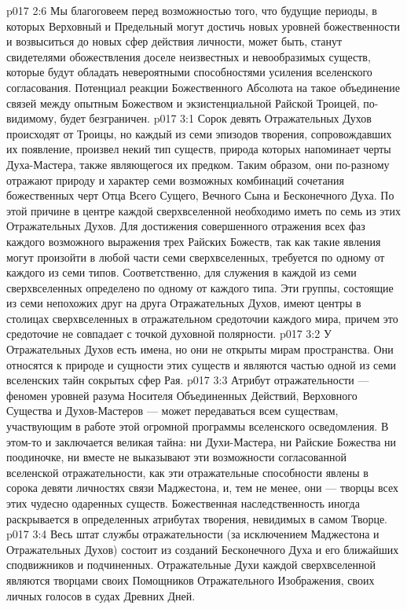 \vs p017 2:6 Мы благоговеем перед возможностью того, что будущие периоды, в которых Верховный и Предельный могут достичь новых уровней божественности и возвыситься до новых сфер действия личности, может быть, станут свидетелями обожествления доселе неизвестных и невообразимых существ, которые будут обладать невероятными способностями усиления вселенского согласования. Потенциал реакции Божественного Абсолюта на такое объединение связей между опытным Божеством и экзистенциальной Райской Троицей, по\hyp{}видимому, будет безграничен.
\vs p017 3:1 Сорок девять Отражательных Духов происходят от Троицы, но каждый из семи эпизодов творения, сопровождавших их появление, произвел некий тип существ, природа которых напоминает черты Духа\hyp{}Мастера, также являющегося их предком. Таким образом, они по\hyp{}разному отражают природу и характер семи возможных комбинаций сочетания божественных черт Отца Всего Сущего, Вечного Сына и Бесконечного Духа. По этой причине в центре каждой сверхвселенной необходимо иметь по семь из этих Отражательных Духов. Для достижения совершенного отражения всех фаз каждого возможного выражения трех Райских Божеств, так как такие явления могут произойти в любой части семи сверхвселенных, требуется по одному от каждого из семи типов. Соответственно, для служения в каждой из семи сверхвселенных определено по одному от каждого типа. Эти группы, состоящие из семи непохожих друг на друга Отражательных Духов, имеют центры в столицах сверхвселенных в отражательном средоточии каждого мира, причем это средоточие не совпадает с точкой духовной полярности.
\vs p017 3:2 У Отражательных Духов есть имена, но они не открыты мирам пространства. Они относятся к природе и сущности этих существ и являются частью одной из семи вселенских тайн сокрытых сфер Рая.
\vs p017 3:3 Атрибут отражательности --- феномен уровней разума Носителя Объединенных Действий, Верховного Существа и Духов\hyp{}Мастеров --- может передаваться всем существам, участвующим в работе этой огромной программы вселенского осведомления. В этом\hyp{}то и заключается великая тайна: ни Духи\hyp{}Мастера, ни Райские Божества ни поодиночке, ни вместе не выказывают эти возможности согласованной вселенской отражательности, как эти отражательные способности явлены в сорока девяти личностях связи Маджестона, и, тем не менее, они --- творцы всех этих чудесно одаренных существ. Божественная наследственность иногда раскрывается в определенных атрибутах творения, невидимых в самом Творце.
\vs p017 3:4 Весь штат службы отражательности (за исключением Маджестона и Отражательных Духов) состоит из созданий Бесконечного Духа и его ближайших сподвижников и подчиненных. Отражательные Духи каждой сверхвселенной являются творцами своих Помощников Отражательного Изображения, своих личных голосов в судах Древних Дней.
